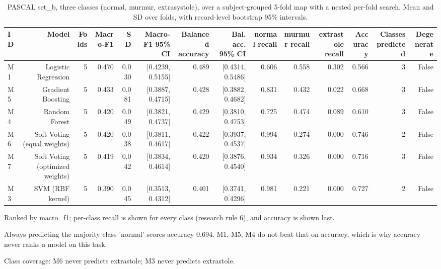 \begin{table}[htbp]
  \centering
  \caption{PASCAL set\_b, three classes (normal, murmur, extrasystole), over a subject-grouped 5-fold map with a nested per-fold search. Mean and SD over folds, with record-level bootstrap 95\% intervals.}
  \label{tab:t12}
  \begin{tabular}{lrrrrrrrrrrrrr}
    \toprule
    ID & Model & Folds & Macro-F1 & SD & Macro-F1 95\% CI & Balanced accuracy & Bal. acc. 95\% CI & normal recall & murmur recall & extrastole recall & Accuracy & Classes predicted & Degenerate \\
    \midrule
    M1 & Logistic Regression & 5 & 0.470 & 0.030 & [0.4239, 0.5155] & 0.489 & [0.4314, 0.5486] & 0.606 & 0.558 & 0.302 & 0.566 & 3 & False \\
    M5 & Gradient Boosting & 5 & 0.433 & 0.081 & [0.3887, 0.4715] & 0.428 & [0.3882, 0.4682] & 0.831 & 0.432 & 0.022 & 0.668 & 3 & False \\
    M4 & Random Forest & 5 & 0.420 & 0.049 & [0.3821, 0.4737] & 0.429 & [0.3810, 0.4753] & 0.725 & 0.474 & 0.089 & 0.610 & 3 & False \\
    M6 & Soft Voting (equal weights) & 5 & 0.420 & 0.038 & [0.3811, 0.4617] & 0.422 & [0.3937, 0.4537] & 0.994 & 0.274 & 0.000 & 0.746 & 2 & False \\
    M7 & Soft Voting (optimized weights) & 5 & 0.419 & 0.042 & [0.3834, 0.4614] & 0.420 & [0.3876, 0.4540] & 0.934 & 0.326 & 0.000 & 0.716 & 3 & False \\
    M3 & SVM (RBF kernel) & 5 & 0.390 & 0.045 & [0.3513, 0.4312] & 0.401 & [0.3741, 0.4296] & 0.981 & 0.221 & 0.000 & 0.727 & 2 & False \\
    \bottomrule
  \end{tabular}
  \par\footnotesize Ranked by macro\_f1; per-class recall is shown for every class (research rule 6), and accuracy is shown last.
  \par\footnotesize Always predicting the majority class 'normal' scores accuracy 0.694. M1, M5, M4 do not beat that on accuracy, which is why accuracy never ranks a model on this task.
  \par\footnotesize Class coverage: M6 never predicts extrastole; M3 never predicts extrastole.

\end{table}
